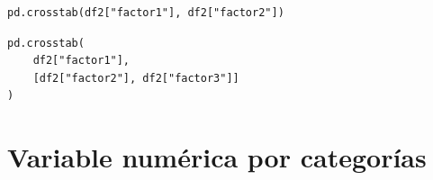 \documentclass[
  a4paper,
  noprof,
  12pt,
  notoc,
  nosols,
  nobib]{mnye}
\theoremstyle{definition}
\theoremstyle{remark}
\begin{document}
\begin{verbatim}
pd.crosstab(df2["factor1"], df2["factor2"])
\end{verbatim}

\begin{verbatim}
pd.crosstab(
    df2["factor1"], 
    [df2["factor2"], df2["factor3"]]
)
\end{verbatim}


\hypertarget{variable-numuxe9rica-por-categoruxedas}{%
\section{Variable numérica por
categorías}\label{variable-numuxe9rica-por-categoruxedas}}




\cleardoublepage
\printsols
\myprintbibliography[title=Bibliografía]
\end{document}

